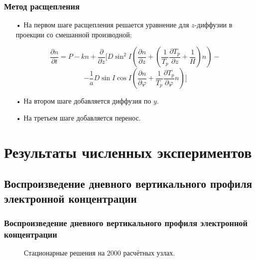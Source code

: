 \documentclass[9pt, apectratio=43,unicode]{beamer}
\begin{document}
\begin{frame}\frametitle{Метод расщепления}
\begin{itemize}
\item[•] На первом шаге расщепления решается уравнение для $z$-диффузии в проекции со смешанной производной;

$$\dfrac{\partial n}{\partial t} =P-kn+\dfrac{\partial}{\partial z}\biggl[D\sin^2 I\left(\dfrac{\partial n}{\partial z}+\left(\dfrac{1}{T_p}\dfrac{\partial T_p}{\partial z}+\dfrac{1}{H}\right)n\right)-$$ $$-\dfrac{1}{a}D\sin I\cos I\left(\dfrac{\partial n}{\partial\varphi}+\dfrac{1}{T_p}\dfrac{\partial T_p}{\partial\varphi}n\right)\biggr]$$ 
\item[•] На втором шаге добавляется диффузия по $y$. 
\item[•] На третьем шаге добавляется перенос.
\end{itemize}
\end{frame}


\section{Результаты численных экспериментов}
\subsection{Воспроизведение дневного вертикального профиля электронной концентрации}
\begin{frame}\frametitle{Воспроизведение дневного вертикального профиля электронной концентрации}
\begin{figure}[H]
\caption{Стационарные решения на $2000$ расчётных узлах.}
\end{figure}
\end{frame}
\end{document}
